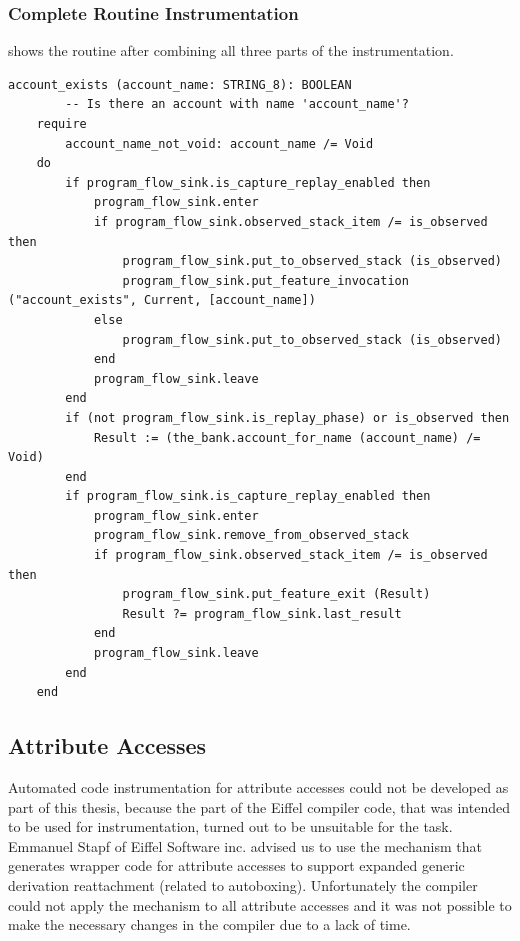 \subsubsection{Complete Routine Instrumentation}
 shows the routine after combining all three parts of the instrumentation.
\begin{lstlisting}[caption=Routine \feature{account\_exists} After Instrumentation,label=lst:account_exists_instrumented]
account_exists (account_name: STRING_8): BOOLEAN
		-- Is there an account with name 'account_name'?
	require
		account_name_not_void: account_name /= Void
	do
		if program_flow_sink.is_capture_replay_enabled then
			program_flow_sink.enter
			if program_flow_sink.observed_stack_item /= is_observed then
				program_flow_sink.put_to_observed_stack (is_observed)
				program_flow_sink.put_feature_invocation ("account_exists", Current, [account_name])
			else
				program_flow_sink.put_to_observed_stack (is_observed)
			end
			program_flow_sink.leave
		end
		if (not program_flow_sink.is_replay_phase) or is_observed then
			Result := (the_bank.account_for_name (account_name) /= Void)
		end
		if program_flow_sink.is_capture_replay_enabled then
			program_flow_sink.enter
			program_flow_sink.remove_from_observed_stack
			if program_flow_sink.observed_stack_item /= is_observed then
				program_flow_sink.put_feature_exit (Result)
				Result ?= program_flow_sink.last_result
			end
			program_flow_sink.leave
		end
	end
\end{lstlisting}


\subsection{Attribute Accesses}
Automated code instrumentation for attribute accesses could not be developed as part of this thesis, because the part of the Eiffel compiler code, that was intended to be used for instrumentation, turned out to be unsuitable for the task. Emmanuel Stapf of Eiffel Software inc. advised us to use the mechanism that generates wrapper code for attribute accesses to support expanded generic derivation reattachment (related to autoboxing). Unfortunately the compiler could not apply the mechanism to all attribute accesses and it was not possible to make the necessary changes in the compiler due to a lack of time.

